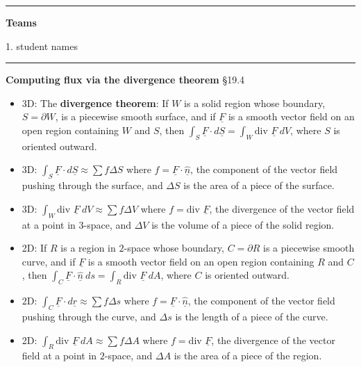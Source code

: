\documentclass[12pt,letterpaper,noanswers]{exam}
\newcommand{\mb}[1]{\underline{#1}}
\begin{document}
\vspace{0.2cm}
\hrule
\vspace{0.2cm}
\noindent\textbf{Teams}

\begin{multicols}{2}

1.  student names
\end{multicols}


\vspace{0.2cm}
\hrule
\vspace{0.2cm}

\eject

\noindent\textbf{Computing flux via the divergence theorem} \S 19.4
\begin{tcolorbox}
\begin{itemize}
\itemsep0em
    \item 3D: The \textbf{divergence theorem}: If $W$ is a solid region whose boundary, $S=\partial W$, is a piecewise smooth surface, and if $\mb F$ is a smooth vector field on an open region containing $W$ and $S$, then $\displaystyle \int_S \mb F\cdot d\mb S = \int_W \text{div }\mb F\ dV$, where $S$ is oriented outward.
    \item 3D: $\displaystyle\int_S \underline F\cdot d\underline S \approx \sum f \Delta S$ where $f = \underline F\cdot \hat{\underline n}$, the component of the vector field pushing through the surface, and $\Delta S$ is the area of a piece of the surface.
    \item 3D: $\displaystyle\int_W \text{div }\underline F\ dV \approx \sum f \Delta V$ where $f = \text{div }\underline F$, the divergence of the vector field at a point in $3$-space, and $\Delta V$ is the volume of a piece of the solid region.
    \item 2D: If $R$ is a region in $2$-space whose boundary, $C = \partial R$ is a piecewise smooth curve, and if $\mb F$ is a smooth vector field on an open region containing $R$ and $C$, then $\displaystyle \int_C \mb F\cdot \hat{\underline n}\ ds = \int_R \text{div }\mb F\ dA$, where $C$ is oriented outward.
    \item 2D: $\displaystyle\int_C \underline F\cdot d\underline r \approx \sum f \Delta s$ where $f = \underline F\cdot \hat{\underline n}$, the component of the vector field pushing through the curve, and $\Delta s$ is the length of a piece of the curve.
    \item 2D: $\displaystyle\int_R \text{div }\underline F\ dA \approx \sum f \Delta A$ where $f = \text{div }\underline F$, the divergence of the vector field at a point in $2$-space, and $\Delta A$ is the area of a piece of the region.
\end{itemize}


\end{tcolorbox}
\end{document}
